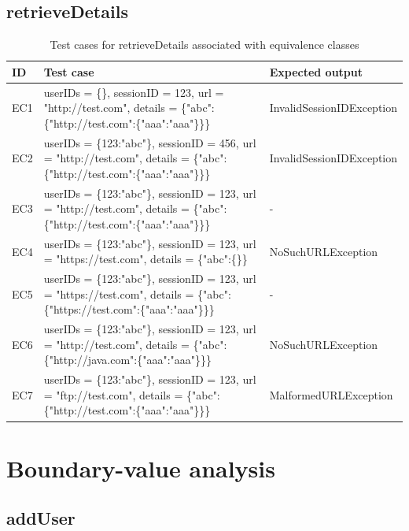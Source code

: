 \documentclass{article}
\begin{document}
\subsection{retrieveDetails}
\begin{longtable}{|p{2cm}|p{7cm}|p{5cm}|}
\caption{Test cases for retrieveDetails associated with equivalence classes}\\
\hline 
ID&Test case&Expected output\\
\hline  
EC1&userIDs = \{\}, sessionID = 123, url = "http://test.com", details = \{"abc":\{"http://test.com":\{"aaa":"aaa"\}\}\}&InvalidSessionIDException\\
\hline
EC2&userIDs = \{123:"abc"\}, sessionID = 456, url = "http://test.com", details = \{"abc":\{"http://test.com":\{"aaa":"aaa"\}\}\}&InvalidSessionIDException\\
\hline
EC3&userIDs = \{123:"abc"\}, sessionID = 123, url = "http://test.com", details = \{"abc":\{"http://test.com":\{"aaa":"aaa"\}\}\}&-\\
\hline
EC4&userIDs = \{123:"abc"\}, sessionID = 123, url = "https://test.com", details = \{"abc":\{\}\}&NoSuchURLException\\
\hline
EC5&userIDs = \{123:"abc"\}, sessionID = 123, url = "https://test.com", details = \{"abc":\{"https://test.com":\{"aaa":"aaa"\}\}\}&-\\
\hline
EC6&userIDs = \{123:"abc"\}, sessionID = 123, url = "http://test.com", details = \{"abc":\{"http://java.com":\{"aaa":"aaa"\}\}\}&NoSuchURLException\\
\hline
EC7&userIDs = \{123:"abc"\}, sessionID = 123, url = "ftp://test.com", details = \{"abc":\{"http://test.com":\{"aaa":"aaa"\}\}\}&MalformedURLException\\
\hline
\end{longtable}

\section{Boundary-value analysis}
\subsection{addUser}
\end{document}
